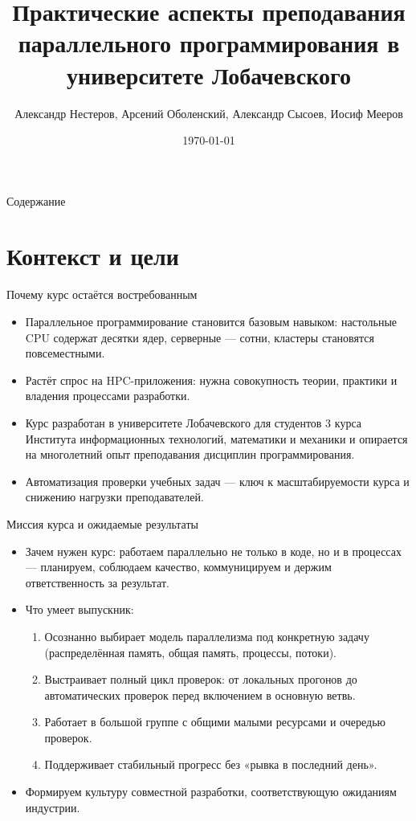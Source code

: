 \documentclass{beamer}
\title[Parallel Programming. Practical Aspects]{Практические аспекты преподавания параллельного программирования в университете Лобачевского}
\author{Александр Нестеров, Арсений Оболенский, Александр Сысоев, Иосиф Мееров}
\institute{Нижегородский Государственный Университет им. Н.И. Лобачевского}
\date{\today}
\begin{document}
\begin{frame}
  \titlepage
\end{frame}

\begin{frame}{Содержание}
  \tableofcontents
\end{frame}

\section{Контекст и цели}

\begin{frame}{Почему курс остаётся востребованным}
  \begin{itemize}
    \item Параллельное программирование становится базовым навыком: настольные CPU содержат десятки ядер, серверные — сотни, кластеры становятся повсеместными.
    \item Растёт спрос на HPC-приложения: нужна совокупность теории, практики и владения процессами разработки.
    \item Курс разработан в университете Лобачевского для студентов 3 курса Института информационных технологий, математики и механики и опирается на многолетний опыт преподавания дисциплин программирования.
    \item Автоматизация проверки учебных задач — ключ к масштабируемости курса и снижению нагрузки преподавателей.
  \end{itemize}
\end{frame}

\begin{frame}{Миссия курса и ожидаемые результаты}
  \begin{itemize}
    \item Зачем нужен курс: работаем параллельно не только в коде, но и в процессах — планируем, соблюдаем качество, коммуницируем и держим ответственность за результат.
    \item Что умеет выпускник:
      \begin{enumerate}[label=\arabic*.]
        \item Осознанно выбирает модель параллелизма под конкретную задачу (распределённая память, общая память, процессы, потоки).
        \item Выстраивает полный цикл проверок: от локальных прогонов до автоматических проверок перед включением в основную ветвь.
        \item Работает в большой группе с общими малыми ресурсами и очередью проверок.
        \item Поддерживает стабильный прогресс без «рывка в последний день».
      \end{enumerate}
    \item Формируем культуру совместной разработки, соответствующую ожиданиям индустрии.
  \end{itemize}
\end{frame}
\end{document}
